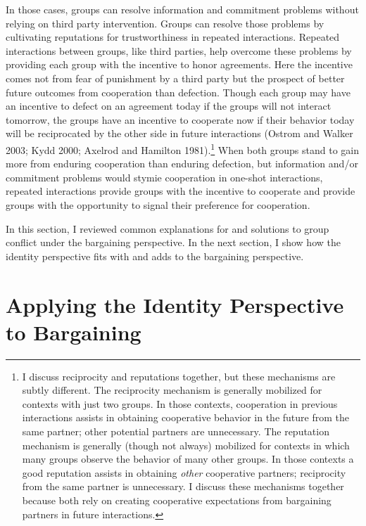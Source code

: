 \documentclass[11pt]{article}
\begin{document}
In those cases, groups can resolve information and commitment problems
without relying on third party intervention. Groups can resolve those
problems by cultivating reputations for trustworthiness in repeated
interactions. Repeated interactions between groups, like third parties,
help overcome these problems by providing each group with the incentive
to honor agreements. Here the incentive comes not from fear of
punishment by a third party but the prospect of better future outcomes
from cooperation than defection. Though each group may have an incentive
to defect on an agreement today if the groups will not interact
tomorrow, the groups have an incentive to cooperate now if their
behavior today will be reciprocated by the other side in future
interactions (Ostrom and Walker 2003; Kydd 2000; Axelrod and Hamilton
1981).\footnote{I discuss reciprocity and reputations together, but
  these mechanisms are subtly different. The reciprocity mechanism is
  generally mobilized for contexts with just two groups. In those
  contexts, cooperation in previous interactions assists in obtaining
  cooperative behavior in the future from the same partner; other
  potential partners are unnecessary. The reputation mechanism is
  generally (though not always) mobilized for contexts in which many
  groups observe the behavior of many other groups. In those contexts a
  good reputation assists in obtaining \emph{other} cooperative
  partners; reciprocity from the same partner is unnecessary. I discuss
  these mechanisms together because both rely on creating cooperative
  expectations from bargaining partners in future interactions.} When
both groups stand to gain more from enduring cooperation than enduring
defection, but information and/or commitment problems would stymie
cooperation in one-shot interactions, repeated interactions provide
groups with the incentive to cooperate and provide groups with the
opportunity to signal their preference for cooperation.

In this section, I reviewed common explanations for and solutions to
group conflict under the bargaining perspective. In the next section, I
show how the identity perspective fits with and adds to the bargaining
perspective.

\hypertarget{applying-the-identity-perspective-to-bargaining}{%
\section{Applying the Identity Perspective to
Bargaining}\label{applying-the-identity-perspective-to-bargaining}}
\end{document}
